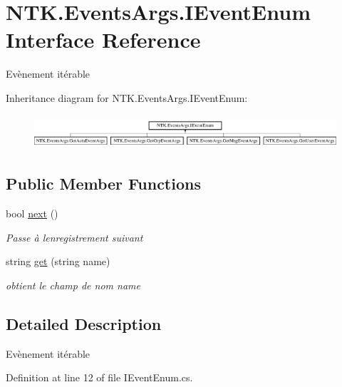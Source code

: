 \hypertarget{interface_n_t_k_1_1_events_args_1_1_i_event_enum}{}\section{N\+T\+K.\+Events\+Args.\+I\+Event\+Enum Interface Reference}
\label{interface_n_t_k_1_1_events_args_1_1_i_event_enum}


Evènement itérable  


Inheritance diagram for N\+T\+K.\+Events\+Args.\+I\+Event\+Enum\+:\begin{figure}[H]
\begin{center}
\leavevmode
\includegraphics[height=1.266968cm]{d8/d47/interface_n_t_k_1_1_events_args_1_1_i_event_enum}
\end{center}
\end{figure}
\subsection*{Public Member Functions}
\begin{DoxyCompactItemize}
\item 
bool \mbox{\hyperlink{interface_n_t_k_1_1_events_args_1_1_i_event_enum_a2b8c40d6d7e9899659aa5a469da93586}{next}} ()
\begin{DoxyCompactList}\small\item\em Passe à l\textquotesingle{}enregistrement suivant \end{DoxyCompactList}\item 
string \mbox{\hyperlink{interface_n_t_k_1_1_events_args_1_1_i_event_enum_a5d7e5d33ce2e0dc3762750b7f1e80414}{get}} (string name)
\begin{DoxyCompactList}\small\item\em obtient le champ de nom {\ttfamily name} \end{DoxyCompactList}\end{DoxyCompactItemize}


\subsection{Detailed Description}
Evènement itérable 



Definition at line 12 of file I\+Event\+Enum.\+cs.



